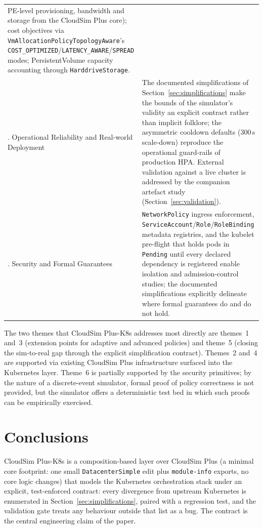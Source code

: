 \documentclass[ASNA,twocolumn]{USG}
\newcommand{\ckm}{CloudSim Plus-K8s\xspace}
\begin{document}
\begin{table}[!t]
\begin{tabular*}{\textwidth}{@{\extracolsep{\fill}}p{}p{}@{}}
PE-level provisioning, bandwidth and storage from the CloudSim Plus
core); cost objectives via \texttt{VmAllocationPolicyTopologyAware}'s
\texttt{COST\_OPTIMIZED}/\texttt{LATENCY\_AWARE}/\texttt{SPREAD} modes;
PersistentVolume capacity accounting through \texttt{HarddriveStorage}. \\
\addlinespace
5. Operational Reliability and Real-world Deployment &
The documented simplifications of Section~\ref{sec:simplifications} make
the bounds of the simulator's validity an explicit contract rather than
implicit folklore; the asymmetric cooldown defaults ($300$\,s scale-down)
reproduce the operational guard-rails of production HPA.
External validation against a live cluster is
addressed by the companion artefact study (Section~\ref{sec:validation}). \\
\addlinespace
6. Security and Formal Guarantees &
\texttt{NetworkPolicy} ingress enforcement,
\texttt{ServiceAccount}/\texttt{Role}/\texttt{RoleBinding} metadata
registries, and the kubelet pre-flight that holds pods in
\texttt{Pending} until every declared dependency is registered enable
isolation and admission-control studies; the documented simplifications
explicitly delineate where formal guarantees do and do not hold. \\
\bottomrule
        \end{tabular*}
    \end{table}

    The two themes that \ckm addresses most directly are themes~1
    and~3 (extension points for adaptive and advanced policies) and
    theme~5 (closing the sim-to-real gap through the explicit
    simplification contract). Themes~2 and~4 are supported via existing
    CloudSim Plus infrastructure surfaced into the Kubernetes layer.
    Theme~6 is partially supported by the security primitives; by the
    nature of a discrete-event simulator, formal proof of policy
    correctness is not provided, but the simulator offers a deterministic
    test bed in which such proofs can be empirically exercised.

    \section{Conclusions}\label{sec:conclusions}

    \ckm is a composition-based layer over CloudSim Plus (a minimal core
    footprint: one small \texttt{DatacenterSimple} edit plus
    \texttt{module-info} exports, no core logic changes) that models the
    Kubernetes orchestration stack under an explicit, test-enforced
    contract: every divergence from upstream Kubernetes is enumerated in
    Section~\ref{sec:simplifications}, paired with a regression test, and
    the validation gate treats any behaviour outside that list as a bug.
    The contract is the
    central engineering claim of the paper.
\end{document}
